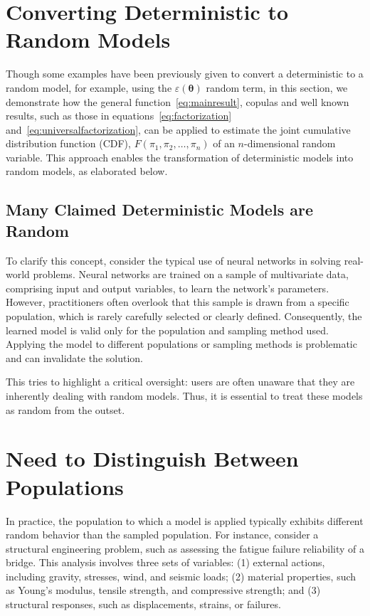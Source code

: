 \documentclass[
	11pt, %
	fleqn, %
	a4paper, %
]{LegrandOrangeBook}
\begin{document}
\section{Converting Deterministic to Random Models}
Though some examples have been previously given to convert a deterministic to a random model, for example, using the $\varepsilon(\boldsymbol{\theta})$ random term, in this section, we demonstrate how the general function~\eqref{eq:mainresult}, copulas and well known results, such as those in equations~\eqref{eq:factorization} and~\eqref{eq:universalfactorization}, can be applied to estimate the joint cumulative distribution function (CDF), $F(\pi_1,\pi_2,\ldots,\pi_n)$ of an $n$-dimensional random variable. This approach enables the transformation of deterministic models into random models, as elaborated below.

\subsection{Many Claimed Deterministic Models are Random}
To clarify this concept, consider the typical use of neural networks in solving real-world problems. Neural networks are trained on a sample of multivariate data, comprising input and output variables, to learn the network's parameters. However, practitioners often overlook that this sample is drawn from a specific population, which is rarely carefully selected or clearly defined. Consequently, the learned model is valid only for the population and sampling method used. Applying the model to different populations or sampling methods is problematic and can invalidate the solution.

This tries to highlight a critical oversight: users are often unaware that they are inherently dealing with random models. Thus, it is essential to treat these models as random from the outset.

\section{Need to Distinguish Between Populations}
In practice, the population to which a model is applied typically exhibits different random behavior than the sampled population. For instance, consider a structural engineering problem, such as assessing the fatigue failure reliability of a bridge. This analysis involves three sets of variables: (1) external actions, including gravity, stresses, wind, and seismic loads; (2) material properties, such as Young's modulus, tensile strength, and compressive strength; and (3) structural responses, such as displacements, strains, or failures.
\end{document}
